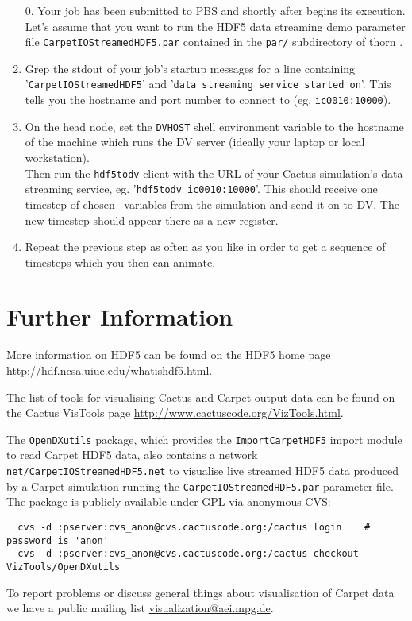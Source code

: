 \documentclass{article}
\begin{document}
\begin{enumerate}
  \item[0.] Your job has been submitted to PBS and shortly after begins its
        execution.\\
        Let's assume that you want to run the HDF5 data streaming
        demo parameter file {\tt CarpetIOStreamedHDF5.par} contained in the
        {\tt par/} subdirectory of thorn \ThisThorn.

  \item Grep the stdout of your job's startup messages for a line
        containing '{\tt CarpetIOStreamedHDF5}' and '{\tt data streaming
        service started on}'.
        This tells you the hostname and port number to connect to (eg. {\tt ic0010:10000}).

  \item On the head node, set the {\tt DVHOST} shell environment variable
        to the hostname of the machine which runs the DV server (ideally
        your laptop or local workstation).\\
        Then run the {\tt hdf5todv} client
        with the URL of your Cactus simulation's data streaming service, eg.
        '{\tt hdf5todv ic0010:10000}'. This should receive one timestep of
        chosen \ThisThorn\ variables from the simulation and
        send it on to DV. The new timestep should appear there as a new
        register.

  \item Repeat the previous step as often as you like in order
        to get a sequence of timesteps which you then can animate.

\end{enumerate}

\section{Further Information}

More information on HDF5 can be found on the HDF5 home page
\url{http://hdf.ncsa.uiuc.edu/whatishdf5.html}.

The list of tools for visualising Cactus and Carpet output data can be found
on the Cactus VisTools page \url{http://www.cactuscode.org/VizTools.html}.

The {\tt OpenDXutils} package, which provides the {\tt ImportCarpetHDF5} import
module to read Carpet HDF5 data, also contains a network {\tt
net/CarpetIOStreamedHDF5.net} to visualise live streamed HDF5 data produced
by a Carpet simulation running the {\tt CarpetIOStreamedHDF5.par} parameter
file. The package is publicly available under GPL via anonymous CVS:
\begin{verbatim}
  cvs -d :pserver:cvs_anon@cvs.cactuscode.org:/cactus login    # password is 'anon'
  cvs -d :pserver:cvs_anon@cvs.cactuscode.org:/cactus checkout VizTools/OpenDXutils
\end{verbatim}

To report problems or discuss general things about visualisation of Carpet data
we have a public mailing list \url{visualization@aei.mpg.de}.

\end{document}
